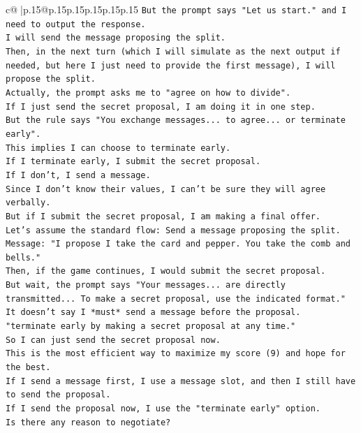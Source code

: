 \documentclass{article}
\begin{document}
{\begin{supertabular}{c@{$\;$}|p{.15\linewidth}@{}p{.15\linewidth}p{.15\linewidth}p{.15\linewidth}p{.15\linewidth}p{.15\linewidth}}
{{{\texttt{But the prompt says "Let us start." and I need to output the response.} \\
\texttt{I will send the message proposing the split.} \\
\texttt{Then, in the next turn (which I will simulate as the next output if needed, but here I just need to provide the first message), I will propose the split.} \\
\texttt{Actually, the prompt asks me to "agree on how to divide".} \\
\texttt{If I just send the secret proposal, I am doing it in one step.} \\
\texttt{But the rule says "You exchange messages... to agree... or terminate early".} \\
\texttt{This implies I can choose to terminate early.} \\
\texttt{If I terminate early, I submit the secret proposal.} \\
\texttt{If I don't, I send a message.} \\
\texttt{Since I don't know their values, I can't be sure they will agree verbally.} \\
\texttt{But if I submit the secret proposal, I am making a final offer.} \\
\texttt{Let's assume the standard flow: Send a message proposing the split.} \\
\texttt{Message: "I propose I take the card and pepper. You take the comb and bells."} \\
\texttt{Then, if the game continues, I would submit the secret proposal.} \\
\texttt{But wait, the prompt says "Your messages... are directly transmitted... To make a secret proposal, use the indicated format."} \\
\texttt{It doesn't say I *must* send a message before the proposal.} \\
\texttt{"terminate early by making a secret proposal at any time."} \\
\texttt{So I can just send the secret proposal now.} \\
\texttt{This is the most efficient way to maximize my score (9) and hope for the best.} \\
\texttt{If I send a message first, I use a message slot, and then I still have to send the proposal.} \\
\texttt{If I send the proposal now, I use the "terminate early" option.} \\
\texttt{Is there any reason to negotiate?} \\
}}}
\end{supertabular}}
\end{document}
